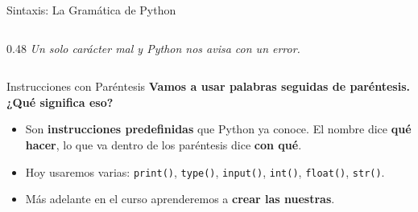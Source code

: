 \documentclass[aspectratio=169, 11pt]{beamer}
\begin{document}
\begin{frame}{Sintaxis: La Gramática de Python}
\begin{columns}[T]
\begin{column}{0.48\textwidth}
      \vspace{2pt}
      {\scriptsize\color{textMuted}\itshape
        Un solo carácter mal y Python nos avisa con un error.}
    \end{column}
  \end{columns}
\end{frame}

\begin{frame}[fragile]{Instrucciones con Paréntesis}
  \vspace{-6pt}
  {\small\color{arcaDark}\bfseries
    Vamos a usar palabras seguidas de paréntesis. ¿Qué significa eso?}

  \vspace{6pt}
  \begin{center}
  \end{center}

  \vspace{2pt}
  {\footnotesize\color{textMuted}
  \begin{itemize}\setlength{\itemsep}{4pt}
    \item[{\color{arcaRed}\scriptsize\faArrowRight}]
      Son \textbf{instrucciones predefinidas} que Python ya conoce.
      El nombre dice \textbf{qué hacer}, lo que va dentro de los
      paréntesis dice \textbf{con qué}.

    \item[{\color{arcaRed}\scriptsize\faArrowRight}]
      Hoy usaremos varias:
      \texttt{print()}, \texttt{type()}, \texttt{input()},
      \texttt{int()}, \texttt{float()}, \texttt{str()}.

    \item[{\color{arcaRed}\scriptsize\faArrowRight}]
      Más adelante en el curso aprenderemos a
      \textbf{crear las nuestras}.
  \end{itemize}
  }
\end{frame}
\end{document}
